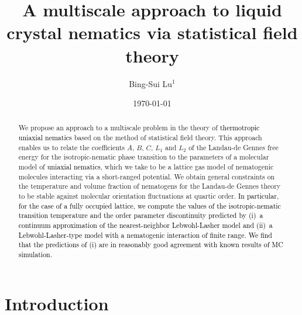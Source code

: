 \documentclass[jcp,aps,twocolumn,showpacs,supergroupedaddress,epsfig,amsmath,amssymb,eqsecnum]{revtex4}
\newcommand{\bing}[1]{\textcolor{black}{#1}}
\begin{document}
\title{A multiscale approach to liquid crystal nematics via statistical field theory}
\author{Bing-Sui Lu$^1$}
\date{\today}

\begin{abstract}
We propose an approach to a multiscale problem in the theory of \bing{thermotropic uniaxial nematics} based on the method of statistical field theory. This approach enables us to relate the coefficients $A$, $B$, $C$, $L_1$ and $L_2$ of the Landau-de Gennes free energy for the isotropic-nematic phase transition to the parameters of a molecular model of \bing{uniaxial nematics}, which we take to be a lattice gas model of nematogenic molecules interacting via a short-ranged potential. We obtain general constraints on the temperature and volume fraction of nematogens for the Landau-de Gennes theory to be stable against molecular orientation fluctuations at quartic order. \bing{In particular, for the case of a fully occupied lattice, we compute the values of the isotropic-nematic transition temperature and the order parameter discontinuity predicted by (i)~a continuum approximation of the nearest-neighbor Lebwohl-Lasher model and (ii)~a Lebwohl-Lasher-type model with a nematogenic interaction of finite range. We find that the predictions of (i) are in reasonably good agreement with known results of MC simulation. }
\end{abstract}

\maketitle

\section{Introduction}
\end{document}
